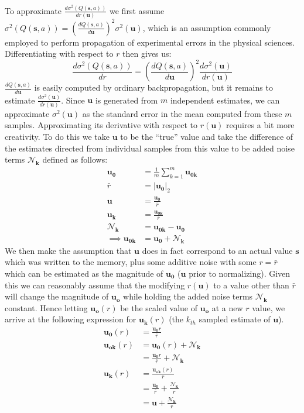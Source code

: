 \documentclass{article}
\begin{document}
To approximate $\frac{d\sigma^2(Q(\pmb{s},a))}{dr(\pmb{u})}$ we first assume $\sigma^2(Q(\pmb{s},a)) = \left(\frac{dQ(\pmb{s},a)}{d\pmb{u}}\right)^2\sigma^2(\pmb{u})$, which is an assumption commonly employed to perform propagation of experimental errors in the physical sciences. Differentiating with respect to $r$ then gives us: 
$$\frac{d\sigma^2(Q(\pmb{s},a))}{dr} = \left(\frac{dQ(\pmb{s},a)}{d\pmb{u}}\right)^2\frac{d\sigma^2(\pmb{u})}{dr(\pmb{u})}$$
$\frac{dQ(\pmb{s},a)}{d\pmb{u}}$ is easily computed by ordinary backpropagation, but it remains to estimate $\frac{d\sigma^2(\pmb{u})}{dr(\pmb{u})}$. Since $\pmb{u}$ is generated from $m$ independent estimates, we can approximate $\sigma^2(\pmb{u})$ as the standard error in the mean computed from these $m$ samples. Approximating its derivative with respect to $r(\pmb{u})$ requires a bit more creativity. To do this we take $\pmb{u}$ to be the ``true'' value and take the difference of the estimates directed from individual samples from this value to be added noise terms $\pmb{\mathcal{N}_k}$ defined as follows:
\begin{align*}
\pmb{u_0}&=\frac{1}{m}\sum_{k=1}^m\pmb{u_{0k}}\\
\bar{r}&=|\pmb{u_0}|_2\\
\pmb{u}&=\frac{\pmb{u_0}}{\bar{r}}\\
\pmb{u_k} &= \frac{\pmb{u_{0k}}}{\bar{r}}\\
\pmb{\mathcal{N}_k}&=\pmb{u_{0k}}-\pmb{u_0}\\
\implies\pmb{u_{0k}}&=\pmb{u_0}+\pmb{\mathcal{N}_k}
\end{align*}
We then make the assumption that $\pmb{u}$ does in fact correspond to an actual value $\pmb{s}$ which was written to the memory, plus some additive noise with some $r=\bar{r}$ which can be estimated as the magnitude of $\pmb{u_0}$ ($\pmb{u}$ prior to normalizing). Given this we can reasonably assume that the modifying $r(\pmb{u})$ to a value other than $\bar{r}$ will change the magnitude of $\pmb{u_o}$ while holding the added noise terms $\pmb{\mathcal{N}_k}$ constant. Hence letting $\pmb{u_o}(r)$ be the scaled value of $\pmb{u_o}$ at a new $r$ value, we arrive at the following expression for $\pmb{u_k}(r)$ (the $k_{th}$ sampled estimate of $\pmb{u}$).
\begin{align*}
\pmb{u_0}(r) &= \frac{\pmb{u_0}r}{\bar{r}}\\
\pmb{u_{ok}}(r) &= \pmb{u_0}(r)+\pmb{\mathcal{N}_k}\\
&=\frac{\pmb{u_0}r}{\bar{r}}+\pmb{\mathcal{N}_k}\\
\pmb{u_k}(r) &= \frac{\pmb{u_{ok}}(r)}{r}\\
&= \frac{\pmb{u_0}}{\bar{r}}+\frac{\pmb{\mathcal{N}_k}}{r}\\
&=\pmb{u}+\frac{\pmb{\mathcal{N}_k}}{r}
\end{align*}
\end{document}
